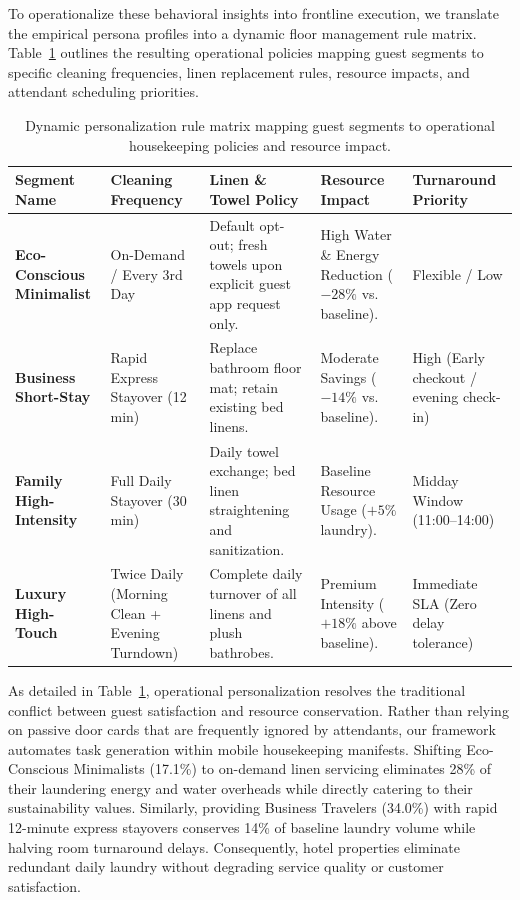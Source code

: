\documentclass[11pt,a4paper]{article}
\begin{document}
To operationalize these behavioral insights into frontline execution, we translate the empirical persona profiles into a dynamic floor management rule matrix. Table~\ref{tab:personalization_rules} outlines the resulting operational policies mapping guest segments to specific cleaning frequencies, linen replacement rules, resource impacts, and attendant scheduling priorities.

\begin{table}[H]
\centering
\small
\caption{Dynamic personalization rule matrix mapping guest segments to operational housekeeping policies and resource impact.}
\label{tab:personalization_rules}
\begin{tabularx}{\textwidth}{>{\raggedright\arraybackslash}p{2.4cm} >{\raggedright\arraybackslash}p{3.1cm} X >{\raggedright\arraybackslash}p{2.7cm} >{\raggedright\arraybackslash}p{2.3cm}}
\toprule
\textbf{Segment Name} & \textbf{Cleaning Frequency} & \textbf{Linen \& Towel Policy} & \textbf{Resource Impact} & \textbf{Turnaround Priority} \\
\midrule
\textbf{Eco-Conscious Minimalist} & On-Demand / Every 3rd Day & Default opt-out; fresh towels upon explicit guest app request only. & High Water \& Energy Reduction ($-28\%$ vs. baseline). & Flexible / Low \\
\addlinespace
\textbf{Business Short-Stay} & Rapid Express Stayover (12 min) & Replace bathroom floor mat; retain existing bed linens. & Moderate Savings ($-14\%$ vs. baseline). & High (Early checkout / evening check-in) \\
\addlinespace
\textbf{Family High-Intensity} & Full Daily Stayover (30 min) & Daily towel exchange; bed linen straightening and sanitization. & Baseline Resource Usage ($+5\%$ laundry). & Midday Window (11:00--14:00) \\
\addlinespace
\textbf{Luxury High-Touch} & Twice Daily (Morning Clean + Evening Turndown) & Complete daily turnover of all linens and plush bathrobes. & Premium Intensity ($+18\%$ above baseline). & Immediate SLA (Zero delay tolerance) \\
\bottomrule
\end{tabularx}
\end{table}

As detailed in Table~\ref{tab:personalization_rules}, operational personalization resolves the traditional conflict between guest satisfaction and resource conservation. Rather than relying on passive door cards that are frequently ignored by attendants, our framework automates task generation within mobile housekeeping manifests. Shifting Eco-Conscious Minimalists (17.1\%) to on-demand linen servicing eliminates 28\% of their laundering energy and water overheads while directly catering to their sustainability values. Similarly, providing Business Travelers (34.0\%) with rapid 12-minute express stayovers conserves 14\% of baseline laundry volume while halving room turnaround delays. Consequently, hotel properties eliminate redundant daily laundry without degrading service quality or customer satisfaction.
\end{document}
